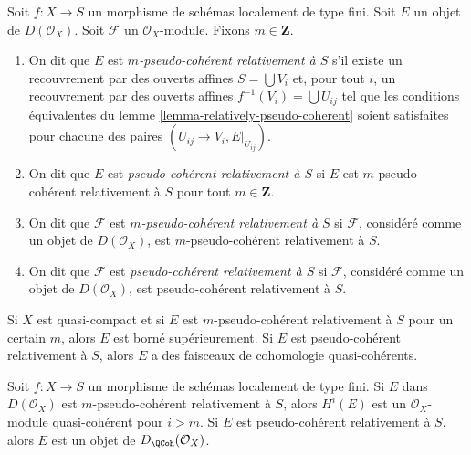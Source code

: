 \begin{definition}
\label{definition-relative-pseudo-coherence}
Soit $f : X \to S$ un morphisme de schémas localement de type fini.
Soit $E$ un objet de $D(\mathcal{O}_X)$. Soit $\mathcal{F}$ un
$\mathcal{O}_X$-module. Fixons $m \in \mathbf{Z}$.
\begin{enumerate}
\item On dit que $E$ est {\it $m$-pseudo-cohérent relativement à $S$}
s'il existe un recouvrement par des ouverts affines $S = \bigcup V_i$ et,
pour tout $i$, un recouvrement par des ouverts affines $f^{-1}(V_i) = \bigcup U_{ij}$
tel que les conditions équivalentes du
lemme \ref{lemma-relatively-pseudo-coherent}
soient satisfaites pour chacune des paires $(U_{ij} \to V_i, E|_{U_{ij}})$.
\item On dit que $E$ est {\it pseudo-cohérent relativement à $S$}
si $E$ est $m$-pseudo-cohérent relativement à $S$ pour tout $m \in \mathbf{Z}$.
\item On dit que $\mathcal{F}$ est {\it $m$-pseudo-cohérent relativement à $S$} si
$\mathcal{F}$, considéré comme un objet de $D(\mathcal{O}_X)$, est
$m$-pseudo-cohérent relativement à $S$.
\item On dit que $\mathcal{F}$ est {\it pseudo-cohérent relativement à $S$} si
$\mathcal{F}$, considéré comme un objet de $D(\mathcal{O}_X)$, est
pseudo-cohérent relativement à $S$.
\end{enumerate}
\end{definition}

\noindent
Si $X$ est quasi-compact et si $E$ est $m$-pseudo-cohérent relativement à $S$
pour un certain $m$, alors $E$ est borné supérieurement. Si $E$ est
pseudo-cohérent relativement à $S$, alors $E$ a des faisceaux de cohomologie
quasi-cohérents.

\begin{lemma}
\label{lemma-relative-pseudo-coherence}
Soit $f : X \to S$ un morphisme de schémas localement de type fini.
Si $E$ dans $D(\mathcal{O}_X)$ est $m$-pseudo-cohérent relativement à $S$,
alors $H^i(E)$ est un $\mathcal{O}_X$-module quasi-cohérent pour $i > m$.
Si $E$ est pseudo-cohérent relativement à $S$, alors $E$ est un objet de
$D_\QCoh(\mathcal{O}_X)$.
\end{lemma}

